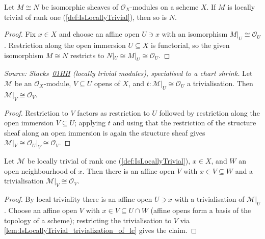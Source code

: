 \begin{lemma}
  \label{lem:locally_trivial_of_iso}
  Let \(M \cong N\) be isomorphic sheaves of \(\mathcal O_X\)-modules on a
  scheme \(X\).  If \(M\) is locally trivial of rank one
  (\cref{def:IsLocallyTrivial}), then so is \(N\).
\end{lemma}
\begin{proof}\leanok
  Fix \(x \in X\) and choose an affine open \(U \ni x\) with an isomorphism
  \(M|_U \cong \mathcal O_U\).  Restriction along the open immersion
  \(U \subseteq X\) is functorial, so the given isomorphism \(M \cong N\)
  restricts to \(N|_U \cong M|_U \cong \mathcal O_U\).
\end{proof}

\begin{lemma}
  \label{lem:IsLocallyTrivial_trivialization_of_le}
  \textit{Source: Stacks~\href{https://stacks.math.columbia.edu/tag/01HH}{01HH}
  (locally trivial modules), specialised to a chart shrink.}
  Let \(\mathcal M\) be an \(\mathcal O_X\)-module, \(V \subseteq U\) opens of
  \(X\), and \(t : \mathcal M|_U \cong \mathcal O_U\) a trivialisation. Then
  \(\mathcal M|_V \cong \mathcal O_V\).
\end{lemma}
\begin{proof}\leanok
  Restriction to \(V\) factors as restriction to \(U\) followed by
  restriction along the open immersion \(V \subseteq U\); applying \(t\) and
  using that the restriction of the structure sheaf along an open immersion
  is again the structure sheaf gives \(\mathcal M|_V \cong \mathcal O_U|_V
  \cong \mathcal O_V\).
\end{proof}

\begin{lemma}
  \label{cor:IsLocallyTrivial_exists_affine_trivializing_le}
  Let \(\mathcal M\) be locally trivial of rank one
  (\cref{def:IsLocallyTrivial}), \(x \in X\), and \(W\) an open neighbourhood
  of \(x\). Then there is an affine open \(V\) with \(x \in V \subseteq W\)
  and a trivialisation \(\mathcal M|_V \cong \mathcal O_V\).
\end{lemma}
\begin{proof}\leanok
  By local triviality there is an affine open \(U \ni x\) with a
  trivialisation of \(\mathcal M|_U\). Choose an affine open \(V\) with
  \(x \in V \subseteq U \cap W\) (affine opens form a basis of the topology
  of a scheme); restricting the trivialisation to \(V\) via
  \cref{lem:IsLocallyTrivial_trivialization_of_le} gives the claim.
\end{proof}

